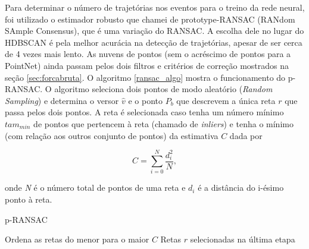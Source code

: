 \documentclass[a4paper,12pt,oneside]{book}
\begin{document}
\par Para determinar o número de trajetórias nos eventos para o treino da rede neural, foi utilizado o estimador robusto que chamei de prototype-RANSAC (RANdom SAmple Consensus), que é uma variação do RANSAC. A escolha dele no lugar do HDBSCAN é pela melhor acurácia na detecção de trajetórias, apesar de ser cerca de 4 vezes mais lento. As nuvens de pontos (sem o acréscimo de pontos para a PointNet) ainda passam pelos dois filtros e critérios de correção mostrados na seção \ref{sec:forcabruta}. O algoritmo \ref{ransac_algo} mostra o funcionamento do p-RANSAC. O algoritmo seleciona dois pontos de modo aleatório (\textit{Random Sampling}) e determina o versor $\hat{v}$ e o ponto $P_b$ que descrevem a única reta $r$ que passa pelos dois pontos. A reta é selecionada caso tenha um número mínimo $tam_{min}$ de pontos que pertencem à reta (chamado de \textit{inliers}) e tenha o mínimo (com relação aos outros conjunto de pontos) da estimativa $C$ dada por

\begin{equation} \label{criterio_ransac}
    C = \sum_{i = 0}^{N} \frac{d_i ^2}{N},
\end{equation}

onde \textit{N} é o número total de pontos de uma reta e $d_i$ é a distância do i-ésimo ponto à reta.

\begin{algorithm}[H]
    \caption{p-RANSAC}\label{ransac_algo}
    Ordena as retas do menor para o maior $C$\;
    \Return Retas $r$ selecionadas na última etapa\;
\end{algorithm}
\end{document}
